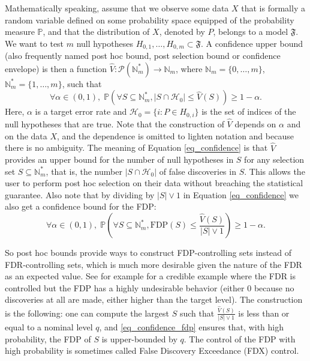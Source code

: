 \documentclass[
  11pt,
  a4paper,
]{article}
\theoremstyle{plain}
\theoremstyle{definition}
\theoremstyle{plain}
\theoremstyle{definition}
\theoremstyle{plain}
\theoremstyle{remark}
\begin{document}
Mathematically speaking, assume that we observe some data \(X\) that is
formally a random variable defined on some probability space equipped of
the probability measure \(\mathbb P\), and that the distribution of
\(X\), denoted by \(P\), belongs to a model \(\mathfrak{F}\). We want to
test \(m\) null hypotheses
\(H_{0,1},\dotsc,H_{0,m} \subset \mathfrak{F}\). A confidence upper
bound (also frequently named post hoc bound, post selection bound or
confidence envelope) is then a function
\(\widehat V: \mathcal{P}(\mathbb{N}_m^*) \to \mathbb{N}_m\), where
\(\mathbb{N}_m=\{0,\dotsc,m\}\), \(\mathbb{N}_m^*=\{1,\dotsc,m\}\), such
that \begin{equation}
\forall \alpha \in (0,1),\; \mathbb{P}\left(\forall S \subseteq \mathbb{N}_m^*, |S\cap \mathcal{H}_0|\leq \widehat V(S)\right)\geq 1-\alpha.
\label{eq_confidence}
\end{equation} Here, \(\alpha\) is a target error rate and
\(\mathcal{H}_0=\{i: P\in H_{0,i}\}\) is the set of indices of the null
hypotheses that are true. Note that the construction of \(\widehat V\)
depends on \(\alpha\) and on the data \(X\), and the dependence is
omitted to lighten notation and because there is no ambiguity. The
meaning of Equation \eqref{eq_confidence} is that \(\widehat V\)
provides an upper bound for the number of null hypotheses in \(S\) for
any selection set \(S\subseteq \mathbb{N}_m^*\), that is, the number
\(|S\cap \mathcal{H}_0|\) of false discoveries in \(S\). This allows the
user to perform post hoc selection on their data without breaching the
statistical guarantee. Also note that by dividing by \(|S|\vee 1\) in
Equation \eqref{eq_confidence} we also get a confidence bound for the
FDP: \begin{equation}
\forall \alpha \in (0,1),\; \mathbb{P}\left(\forall S \subseteq \mathbb{N}_m^*, \mathrm{FDP}(S)\leq \frac{\widehat V(S)}{|S|\vee 1}\right)\geq 1-\alpha.
\label{eq_confidence_fdp}
\end{equation}

So post hoc bounds provide ways to construct FDP-controlling sets
instead of FDR-controlling sets, which is much more desirable given the
nature of the FDR as an expected value. See for example \citep[Figure
4]{MR3418717} for a credible example where the FDR is controlled but the
FDP has a highly undesirable behavior (either 0 because no discoveries
at all are made, either higher than the target level). The construction
is the following: one can compute the largest \(S\) such that
\(\frac{\widehat V(S)}{|S|\vee 1}\) is less than or equal to a nominal
level \(q\), and \eqref{eq_confidence_fdp} ensures that, with high
probability, the FDP of \(S\) is upper-bounded by \(q\). The control of
the FDP with high probability is sometimes called False Discovery
Exceedance (FDX) control.
\end{document}
